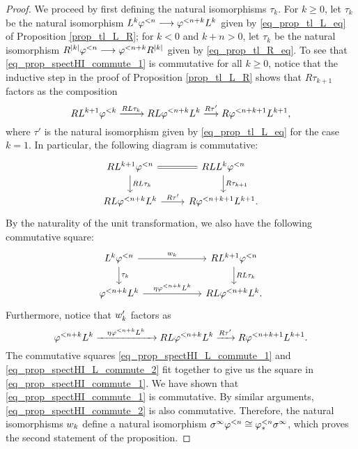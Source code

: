 \begin{proof}
We proceed by first defining the natural isomorphisms $\tau_k$.
For $k \geq 0$, let $\tau_k$ be the natural isomorphism 
$L^k\varphi^{< n} \longrightarrow \varphi^{< n + k}L^k$ given by 
\eqref{eq_prop_tl_L_eq} of Proposition \ref{prop_tl_L_R};
for $k < 0$ and $k + n > 0$, let $\tau_k$ be the natural 
isomorphism $R^{|k|}\varphi^{< n} \longrightarrow \varphi^{< n + k} R^{|k|}$ given by 
\eqref{eq_prop_tl_R_eq}.  
To see that \eqref{eq_prop_spectHI_commute_1} is commutative for
all $k \geq 0$, notice that the inductive step in the proof of 
Proposition \ref{prop_tl_L_R} shows that $R\tau_{k + 1}$ factors
as the composition
\[
RL^{k + 1}\varphi^{< k} \xrightarrow{RL\tau_k}
RL\varphi^{< n + k}L^k \stackrel{R\tau'}{\longrightarrow} 
R\varphi^{< n + k + 1}L^{k + 1},
\]
where $\tau'$ is the natural isomorphism given by
\eqref{eq_prop_tl_L_eq} for the case $k = 1$. In particular,
the following diagram is commutative:
\begin{equation}\label{eq_prop_spectHI_L_commute_1}
\begin{tikzcd}
RL^{k + 1}\tlHI{n} \arrow[equals]{r} \arrow{d}{RL\tau_{k}} &
RLL^{k}\tlHI{n} \arrow{d}{R\tau_{k + 1}} \\
RL\tlHI{n + k}L^k \arrow{r}{R\tau'} &
R\tlHI{n + k + 1}L^{k + 1}.
\end{tikzcd}
\end{equation}
By the naturality of the unit transformation,
we also have the following commutative square:
\begin{equation}\label{eq_prop_spectHI_L_commute_2}
\begin{tikzcd}[column sep=60pt]
L^k\tlHI{n} \arrow{d}{\tau_k} \arrow{r}{\deloop_k}  &
RL^{k + 1}\tlHI{n} \arrow{d}{RL\tau_k}\\
\tlHI{n + k}L^k \arrow{r}{\eta\tlHI{n + k}L^k} &
RL\tlHI{n + k}L^k.
\end{tikzcd}
\end{equation}
Furthermore, notice that $w_k'$ factors as 
\[
\varphi^{< n + k}L^k
\xrightarrow{\phantom{aa}\eta\varphi^{< n + k}L^k \phantom{aa}}
RL\varphi^{< n + k} L^k
\xrightarrow{R\tau'}
R\varphi^{< n + k + 1}L^{k + 1}.
\]
The commutative squares \eqref{eq_prop_spectHI_L_commute_1} 
and \eqref{eq_prop_spectHI_L_commute_2} fit together to give us the
square in \eqref{eq_prop_spectHI_commute_1}. We have shown that
\eqref{eq_prop_spectHI_commute_1} is commutative. By similar
arguments, \eqref{eq_prop_spectHI_commute_2} is also
commutative. Therefore, the natural isomorphisms
$w_k$ define a natural isomorphism  $\sigma^\infty \varphi^{< n} \cong 
\varphi^{< n}_{*}\sigma^\infty$, which proves the second statement of the 
proposition. 
\end{proof}


%
